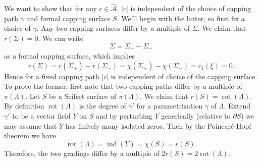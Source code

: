 \documentclass[11pt]{amsart}
\makeatletter
\renewenvironment{proof}[1][\proofname] {\par\pushQED{\qed}{\normalfont\bfseries\topsep6\p@\@plus6\p@\relax #1\@addpunct{.} }}{\popQED\endtrivlist\@endpefalse}
\theoremstyle{mystyle}
\newcommand{\<}{\langle}
\renewcommand{\>}{\rangle}
\DeclareMathOperator{\ind}{\text{ind}}
\DeclareMathOperator{\rot}{\text{rot}}
\makeatother
\begin{document}
\begin{proof}
	We want to show that for any $c\in \widehat{\mathcal{A}}$, $|c|$ is independent of the choice of capping path $\gamma$ and formal capping surface $S$. We'll begin with the latter, so first fix a choice of $\gamma$. Any two capping surfaces differ by a multiple of $\Sigma$. We claim that $r(\Sigma) = 0$. We can write \[\Sigma = \Sigma_+ - \Sigma_-\] as a formal capping surface, which implies \[r(\Sigma) = r(\Sigma_+) - r(\Sigma_-) = \chi(\Sigma_+) - \chi(\Sigma_-) = c_1(\xi) = 0.\] Hence for a fixed capping path $|c|$ is independent of choice of the capping surface. To prove the former, first note that two capping paths differ by a multiple of $\pi(\Lambda)$. Let $S$ be a Seifert surface of $\pi(\Lambda)$. We claim that $r(S) = \rot(\Lambda)$. By definition $\rot(\Lambda)$ is the degree of $\gamma'$ for a parametrization $\gamma$ of $\Lambda$. Extend $\gamma'$ to be a vector field $Y$ on $S$ and by perturbing $Y$ generically (relative to $\partial S$) we may assume that $Y$ has finitely many isolated zeros. Then by the Poincaré-Hopf theorem we have \[\rot(\Lambda) = \ind(Y) = \chi(S) = r(S).\] Therefore, the two gradings differ by a multiple of $2r(S) = 2\rot(\Lambda)$.
\end{proof}
\end{document}
